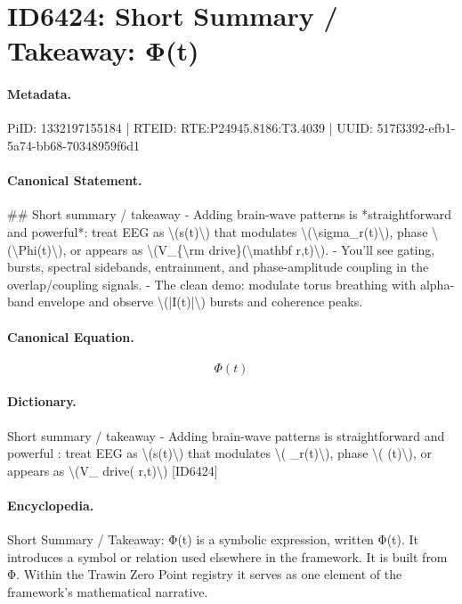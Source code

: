 \section*{ID6424: Short Summary / Takeaway: Φ(t)}
\paragraph{Metadata.}
PiID: 1332197155184 | RTEID: RTE:P24945.8186:T3.4039 | UUID: 517f3392-efb1-5a74-bb68-70348959f6d1

\paragraph{Canonical Statement.}
\#\# Short summary / takeaway - Adding brain-wave patterns is *straightforward and powerful*: treat EEG as \textbackslash{}(s(t)\textbackslash{}) that modulates \textbackslash{}(\textbackslash{}sigma\_r(t)\textbackslash{}), phase \textbackslash{}(\textbackslash{}Phi(t)\textbackslash{}), or appears as \textbackslash{}(V\_\{\textbackslash{}rm drive\}(\textbackslash{}mathbf r,t)\textbackslash{}). - You’ll see gating, bursts, spectral sidebands, entrainment, and phase-amplitude coupling in the overlap/coupling signals. - The clean demo: modulate torus breathing with alpha-band envelope and observe \textbackslash{}(|I(t)|\textbackslash{}) bursts and coherence peaks.

\paragraph{Canonical Equation.}
\[
\Phi(t)
\]

\paragraph{Dictionary.}
Short summary / takeaway - Adding brain-wave patterns is straightforward and powerful : treat EEG as \textbackslash{}(s(t)\textbackslash{}) that modulates \textbackslash{}( \_r(t)\textbackslash{}), phase \textbackslash{}( (t)\textbackslash{}), or appears as \textbackslash{}(V\_ drive( r,t)\textbackslash{}) [ID6424]

\paragraph{Encyclopedia.}
Short Summary / Takeaway: Φ(t) is a symbolic expression, written Φ(t). It introduces a symbol or relation used elsewhere in the framework. It is built from Φ. Within the Trawin Zero Point registry it serves as one element of the framework's mathematical narrative.
